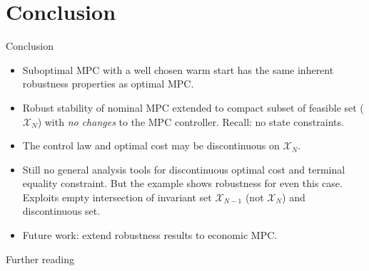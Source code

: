 \documentclass{beamer}
\begin{document}
\section{Conclusion}
\begin{frame}{Conclusion}

\begin{block}{}
\begin{itemize}
\item \alert{Suboptimal} MPC with a well chosen warm start has the same
  inherent robustness properties as \alert{optimal} MPC. \pause
\item Robust stability of nominal MPC extended to compact subset of
  feasible set ($\mathcal{X}_N$) with \textit{no changes} to the MPC
  controller. \pause 
  Recall:   no state constraints. \pause
\item The control law and optimal cost may be \alert{discontinuous} on
  $\mathcal{X}_N$. \pause 
\item Still no general analysis tools for discontinuous optimal cost
  and terminal \alert{equality constraint}.  But the example shows robustness
  for even this case. \pause Exploits \alert{empty} intersection of invariant set
  $\mathcal{X}_{N-1}$ (not $\mathcal{X}_N$) and discontinuous set. \pause
\item Future work: extend robustness results to \alert{economic} MPC.
\end{itemize}
\end{block}

\end{frame}

\begin{frame}[allowframebreaks]{Further reading}

\renewcommand{\refname}{}
\scriptsize


%
\end{frame}
\end{document}
